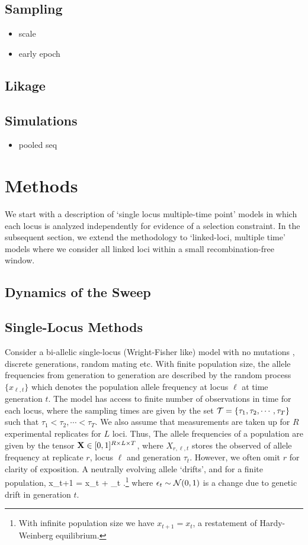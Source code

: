 \documentclass[11pt]{article}
\begin{document}
\subsection{Sampling}
\begin{itemize}
\item scale
\item early epoch
\end{itemize}
\subsection{Likage}

\subsection{Simulations}
\begin{itemize}
\item pooled seq
\end{itemize}

\section{Methods}
We start with a description of `single locus multiple-time point'
models in which each locus is analyzed independently for evidence of a
selection constraint. In the subsequent section, we extend the
methodology to `linked-loci, multiple time' models where we consider
all linked loci within a small recombination-free window.

\subsection{Dynamics of the Sweep}

\subsection{Single-Locus Methods}
Consider a bi-allelic single-locus (Wright-Fisher like) model with no
mutations \cite{Ewens2012Mathematical}, discrete generations, random
 mating etc. With finite population size, the allele frequencies from
generation to generation are described by the random process
$\{x_{\ell,t}\}$ which denotes the population allele frequency at
locus $\ell$ at time generation $t$. The model has access to finite
number of observations in time for each locus, where the sampling
times are given by the set ${\cal T}=\{\tau_1,\tau_2,\cdots, \tau_T \}$
such that $\tau_1<\tau_2,\cdots<\tau_T$. We also assume that
measurements are taken up for $R$ experimental replicates for $L$
loci. Thus, The allele frequencies of a population are given by the
tensor ${\mathbf X} \in [0,1]^{R \times L \times T}$, where $X_{r,\ell,t}$
stores the observed of allele frequency at replicate $r$, locus $\ell$
and generation $\tau_t$. However, we often omit $r$ for clarity of
exposition. A neutrally evolving allele `drifts', and for a finite
population,
\beq x_{t+1} = x_t + \epsilon_t\; .\footnote{With infinite population size
	we have $x_{t+1} = x_t$, a restatement of Hardy-Weinberg
	equilibrium.}
\label{eq:drift}
\eeq where $\epsilon_t \sim {\cal N}(0,1)$ is a change due to genetic drift
in generation $t$.
\end{document}
